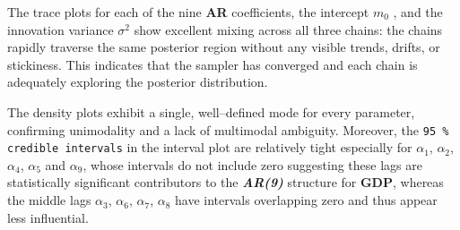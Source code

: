 \documentclass{Configuration_Files/PoliMi3i_thesis}
\begin{document}
The trace plots for each of the nine \textbf{\textbf{AR}} coefficients, the intercept \(m_0\) , and the innovation variance \(\sigma^2\) show excellent mixing across all three chains: the chains rapidly traverse the same posterior region without any visible trends, drifts, or stickiness. This indicates that the sampler has converged and each chain is adequately exploring the posterior distribution.

The density plots exhibit a single, well–defined mode for every parameter, confirming unimodality and a lack of multimodal ambiguity. Moreover, the \texttt{95 \% credible intervals} in the interval plot are relatively tight especially for \(\alpha_1\), \(\alpha_2\), \(\alpha_4\), \(\alpha_5\) and \(\alpha_9\), whose intervals do not include zero suggesting these lags are statistically significant contributors to the \textbf{\textit{AR(9)}} structure for \textbf{GDP}, whereas the middle lags \(\alpha_3\), \(\alpha_6\), \(\alpha_7\), \(\alpha_8\) have intervals overlapping zero and thus appear less influential.
\newpage
\end{document}
